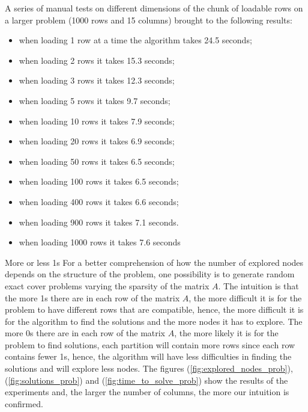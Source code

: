 \documentclass{beamer}
\begin{document}
\begin{frame}
A series of manual tests on
different dimensions of the chunk of loadable rows on a larger problem (1000 rows
and 15 columns) brought to the following results:
\begin{itemize}
    \item when loading 1 row at a time the algorithm takes 24.5 seconds;
    \item when loading 2 rows it takes 15.3 seconds;
    \item when loading 3 rows it takes 12.3 seconds;
    \item when loading 5 rows it takes 9.7 seconds;
    \item when loading 10 rows it takes 7.9 seconds;
    \item when loading 20 rows it takes 6.9 seconds;
    \item when loading 50 rows it takes 6.5 seconds;
    \item when loading 100 rows it takes 6.5 seconds;
    \item when loading 400 rows it takes 6.6 seconds;
    \item when loading 900 rows it takes 7.1 seconds.
    \item when loading 1000 rows it takes 7.6 seconds
\end{itemize}
\end{frame}

\begin{frame}{More or less 1s}
    For a better comprehension of how the number of explored nodes 
    depends on the structure of the problem, one possibility
    is to generate random exact cover problems varying the sparsity
    of the matrix $A$.
    The intuition is that the more 1s there are in each row
    of the matrix $A$, the more difficult it is for the problem
    to have different rows that are compatible,
    hence, the more difficult it is for the algorithm to find
    the solutions and the more nodes it has to explore.
    The more 0s there are in each row of the matrix $A$, the more
    likely it is for the problem to find solutions,
    each partition will contain more rows since each row contains
    fewer 1s, hence, the algorithm will have less difficulties
    in finding the solutions and will explore less nodes.
    The figures (\ref{fig:explored_nodes_prob}), (\ref{fig:solutions_prob})
    and (\ref{fig:time_to_solve_prob}) show the results of the experiments
    and, the larger the number of columns,
    the more our intuition is confirmed.
\end{frame}
\end{document}
